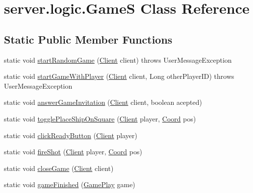 \hypertarget{classserver_1_1logic_1_1_game_s}{}\section{server.\+logic.\+GameS Class Reference}
\label{classserver_1_1logic_1_1_game_s}
\subsection*{Static Public Member Functions}
\begin{DoxyCompactItemize}
\item 
static void \hyperlink{classserver_1_1logic_1_1_game_s_a37c397e3097027a835b756a9c6584c14}{start\+Random\+Game} (\hyperlink{classserver_1_1conn_1_1_client}{Client} client)  throws User\+Message\+Exception 
\item 
static void \hyperlink{classserver_1_1logic_1_1_game_s_a5233992ff9ace095e835a56bd439a55f}{start\+Game\+With\+Player} (\hyperlink{classserver_1_1conn_1_1_client}{Client} client, Long other\+Player\+ID)  throws User\+Message\+Exception 
\item 
static void \hyperlink{classserver_1_1logic_1_1_game_s_a6cc95653ec6cfe464226b7d2cf6308de}{answer\+Game\+Invitation} (\hyperlink{classserver_1_1conn_1_1_client}{Client} client, boolean acepted)
\item 
static void \hyperlink{classserver_1_1logic_1_1_game_s_a3c1375206147f2112c1e339e93166676}{toggle\+Place\+Ship\+On\+Square} (\hyperlink{classserver_1_1conn_1_1_client}{Client} player, \hyperlink{classsharedlib_1_1utils_1_1_coord}{Coord} pos)
\item 
static void \hyperlink{classserver_1_1logic_1_1_game_s_ae6ab66ec3722750bbff9fdaeb6f0ea07}{click\+Ready\+Button} (\hyperlink{classserver_1_1conn_1_1_client}{Client} player)
\item 
static void \hyperlink{classserver_1_1logic_1_1_game_s_aeac56542c71aaa0f3a9571bce4ba962f}{fire\+Shot} (\hyperlink{classserver_1_1conn_1_1_client}{Client} player, \hyperlink{classsharedlib_1_1utils_1_1_coord}{Coord} pos)
\item 
static void \hyperlink{classserver_1_1logic_1_1_game_s_a5ad22688c4bb480a7252f7b92fc6d1e2}{close\+Game} (\hyperlink{classserver_1_1conn_1_1_client}{Client} client)
\item 
static void \hyperlink{classserver_1_1logic_1_1_game_s_a51295bb07c4b243cf798e34eb84eb4ec}{game\+Finished} (\hyperlink{classserver_1_1logic_1_1game_1_1_game_play}{Game\+Play} game)

\end{DoxyCompactItemize}
